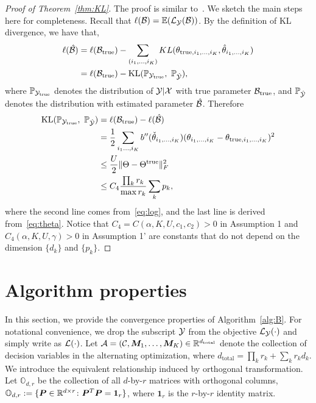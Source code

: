 \documentclass[12pt]{article}
\theoremstyle{definition}
\theoremstyle{definition}
\begin{document}
\begin{proof}[Proof of Theorem~\ref{thm:KL}]
The proof is similar to~\citet{pmlr-v108-berthet20a}. We sketch the main steps here for completeness. Recall that $\ell(\mathcal{B})=\mathbb{E}(\mathcal{L}_{\mathcal{Y}}(\mathcal{B}))$. By the definition of KL divergence, we have that,
\begin{align}
\ell(\hat \tB)&=\ell(\trueB)-\sum_{(i_1,\ldots,i_K)} KL(\theta_{\text{true}, i_1,\ldots, i_K}, \hat \theta_{i_1,\ldots,i_K})\\
&=\ell(\trueB)-\text{KL}(\mathbb{P}_{\tY_{\text{true}}},\ \mathbb{P}_{\hat \tY}),
\end{align}
where $\mathbb{P}_{\mathcal{Y}_{\text{true}}}$ denotes the distribution of $\mathcal{Y}|\mathcal{X}$ with true parameter $\mathcal{B}_{\textup{true}}$, and $\mathbb{P}_{\hat {\mathcal{Y}}}$ denotes the distribution with estimated parameter $\hat {\mathcal{B}}$. Therefore
\begin{align}
\text{KL}(\mathbb{P}_{\mathcal{Y}_{\text{true}}},\ \mathbb{P}_{\hat {\mathcal{Y}}}) &= \ell(\mathcal{B}_{\textup{true}})-\ell(\hat {\mathcal{B}})\\
&={1\over 2}\sum_{i_1\ldots,i_K}b''(\check \theta_{i_1,\ldots,i_K})(\theta_{i_1,\ldots,i_K}-\theta_{\text{true},i_1,\ldots,i_K})^2\\
&\leq {U\over 2} \lVert\Theta-\Theta^{\text{true}}\rVert_F^2\\
&\leq C_4{\prod_k r_k \over \max r_k}\sum_k p_k,
\end{align}
where the second line comes from~\eqref{eq:log}, and the last line is derived from~\eqref{eq:theta}. Notice that $C_4 = C(\alpha,K,U,c_1,c_2)>0$ in Assumption 1 and $C_4(\alpha,K,U,\gamma)>0$ in Assumption 1' are constants that do not depend on the dimension $\{d_k\}$ and $\{p_k\}$. 
\end{proof}


\section{Algorithm properties}\label{sec:SAlgorithm}
In this section, we provide the convergence properties of Algorithm~\ref{alg:B}.
For notational convenience, we drop the subscript $\mathcal{Y}$ from the objective $\mathcal{L}_{\mathcal{Y}}(\cdot)$ and simply write as $\mathcal{L}(\cdot)$. Let $\mathcal{A} = (\mathcal{C}, \bm M_1,\ldots,\bm M_K) \in \mathbb{R}^{d_{\text{total}}}$ denote the collection of decision variables in the alternating optimization, where $d_{\text{total}} = \prod_k r_k + \sum_k r_kd_k$. We introduce the equivalent relationship induced by orthogonal transformation. Let $\mathbb{O}_{d,r}$ be the collection of all $d$-by-$r$ matrices with orthogonal columns, $\mathbb{O}_{d,r}:=\{\bm{P}\in\mathbb{R}^{d\times r}\colon \bm{P}^T\bm{P} = \mathbf{1}_r\}$, where $\mathbf{1}_r$ is the $r$-by-$r$ identity matrix. 
\end{document}
